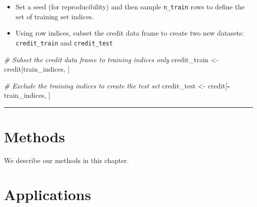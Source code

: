 \documentclass[
]{book}
\newenvironment{Shaded}{\begin{snugshade}}{\end{snugshade}}
\newcommand{\CommentTok}[1]{\textcolor[rgb]{0.56,0.35,0.01}{\textit{#1}}}
\newcommand{\DecValTok}[1]{\textcolor[rgb]{0.00,0.00,0.81}{#1}}
\newcommand{\KeywordTok}[1]{\textcolor[rgb]{0.13,0.29,0.53}{\textbf{#1}}}
\newcommand{\NormalTok}[1]{#1}
\newcommand{\OperatorTok}[1]{\textcolor[rgb]{0.81,0.36,0.00}{\textbf{#1}}}
\newcommand{\StringTok}[1]{\textcolor[rgb]{0.31,0.60,0.02}{#1}}
\providecommand{\tightlist}{%
  \setlength{\itemsep}{0pt}\setlength{\parskip}{0pt}}
\begin{document}
\begin{itemize}
\tightlist
\item
  Set a seed (for reproducibility) and then sample \texttt{n\_train} rows to define the set of training set indices.
\end{itemize}

\begin{Shaded}
\end{Shaded}

\begin{itemize}
\tightlist
\item
  Using row indices, subset the credit data frame to create two new datasets: \texttt{credit\_train} and \texttt{credit\_test}
\end{itemize}

\begin{Shaded}
\begin{Highlighting}[]
\CommentTok{# Subset the credit data frame to training indices only}
\NormalTok{credit_train <-}\StringTok{ }\NormalTok{credit[train_indices, ]  }
  
\CommentTok{# Exclude the training indices to create the test set}
\NormalTok{credit_test <-}\StringTok{ }\NormalTok{credit[}\OperatorTok{-}\NormalTok{train_indices, ]}
\end{Highlighting}
\end{Shaded}

\begin{center}\rule{0.5\linewidth}{0.5pt}\end{center}

\hypertarget{methods}{%
\chapter{Methods}\label{methods}}

We describe our methods in this chapter.

\hypertarget{applications}{%
\chapter{Applications}\label{applications}}
\end{document}

